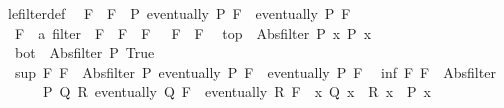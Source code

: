 \begin{isabellebody}
\isanewline
{}\isamarkupfalse%
\ le{\isacharunderscore}{\kern0pt}filter{\isacharunderscore}{\kern0pt}def{\isacharcolon}{\kern0pt}\isanewline
\ \ {\isachardoublequoteopen}F\ {\isasymle}\ F{\isacharprime}{\kern0pt}\ {\isasymlongleftrightarrow}\ {\isacharparenleft}{\kern0pt}{\isasymforall}P{\isachardot}{\kern0pt}\ eventually\ P\ F{\isacharprime}{\kern0pt}\ {\isasymlongrightarrow}\ eventually\ P\ F{\isacharparenright}{\kern0pt}{\isachardoublequoteclose}\isanewline
\isanewline
{}\isamarkupfalse%
\isanewline
\ \ {\isachardoublequoteopen}{\isacharparenleft}{\kern0pt}F\ {\isacharcolon}{\kern0pt}{\isacharcolon}{\kern0pt}\ {\isacharprime}{\kern0pt}a\ filter{\isacharparenright}{\kern0pt}\ {\isacharless}{\kern0pt}\ F{\isacharprime}{\kern0pt}\ {\isasymlongleftrightarrow}\ F\ {\isasymle}\ F{\isacharprime}{\kern0pt}\ {\isasymand}\ {\isasymnot}\ F{\isacharprime}{\kern0pt}\ {\isasymle}\ F{\isachardoublequoteclose}\isanewline
\isanewline
{}\isamarkupfalse%
\isanewline
\ \ {\isachardoublequoteopen}top\ {\isacharequal}{\kern0pt}\ Abs{\isacharunderscore}{\kern0pt}filter\ {\isacharparenleft}{\kern0pt}{\isasymlambda}P{\isachardot}{\kern0pt}\ {\isasymforall}x{\isachardot}{\kern0pt}\ P\ x{\isacharparenright}{\kern0pt}{\isachardoublequoteclose}\isanewline
\isanewline
{}\isamarkupfalse%
\isanewline
\ \ {\isachardoublequoteopen}bot\ {\isacharequal}{\kern0pt}\ Abs{\isacharunderscore}{\kern0pt}filter\ {\isacharparenleft}{\kern0pt}{\isasymlambda}P{\isachardot}{\kern0pt}\ True{\isacharparenright}{\kern0pt}{\isachardoublequoteclose}\isanewline
\isanewline
{}\isamarkupfalse%
\isanewline
\ \ {\isachardoublequoteopen}sup\ F\ F{\isacharprime}{\kern0pt}\ {\isacharequal}{\kern0pt}\ Abs{\isacharunderscore}{\kern0pt}filter\ {\isacharparenleft}{\kern0pt}{\isasymlambda}P{\isachardot}{\kern0pt}\ eventually\ P\ F\ {\isasymand}\ eventually\ P\ F{\isacharprime}{\kern0pt}{\isacharparenright}{\kern0pt}{\isachardoublequoteclose}\isanewline
\isanewline
{}\isamarkupfalse%
\isanewline
\ \ {\isachardoublequoteopen}inf\ F\ F{\isacharprime}{\kern0pt}\ {\isacharequal}{\kern0pt}\ Abs{\isacharunderscore}{\kern0pt}filter\isanewline
\ \ \ \ \ \ {\isacharparenleft}{\kern0pt}{\isasymlambda}P{\isachardot}{\kern0pt}\ {\isasymexists}Q\ R{\isachardot}{\kern0pt}\ eventually\ Q\ F\ {\isasymand}\ eventually\ R\ F{\isacharprime}{\kern0pt}\ {\isasymand}\ {\isacharparenleft}{\kern0pt}{\isasymforall}x{\isachardot}{\kern0pt}\ Q\ x\ {\isasymand}\ R\ x\ {\isasymlongrightarrow}\ P\ x{\isacharparenright}{\kern0pt}{\isacharparenright}{\kern0pt}{\isachardoublequoteclose}\isanewline

\end{isabellebody}
